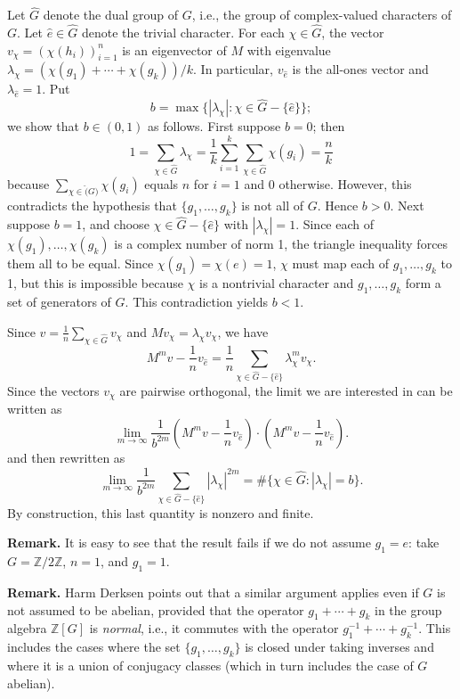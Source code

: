 \documentclass[amssymb,twocolumn,pra,10pt,aps]{revtex4-1}
\newcommand{\ZZ}{\mathbb{Z}}
\begin{document}
\begin{itemize}
Let $\hat{G}$ denote the dual group of $G$, i.e., the group of complex-valued characters of $G$.
Let $\hat{e} \in \hat{G}$ denote the trivial character.
For each $\chi \in \hat{G}$, the vector $v_\chi = (\chi(h_i))_{i=1}^n$ is an eigenvector of $M$
with eigenvalue $\lambda_\chi = (\chi(g_1) + \cdots + \chi(g_k))/k$.
In particular, $v_{\hat{e}}$ is the all-ones vector and $\lambda_{\hat{e}} = 1$.
Put
\[
b = \max\{|\lambda_\chi|: \chi \in \hat{G} - \{\hat{e}\}\};
\]
we show that $b \in (0,1)$ as follows.
First suppose $b=0$; then
\[
1 = \sum_{\chi \in \hat{G}} \lambda_\chi
= \frac{1}{k} \sum_{i=1}^k \sum_{\chi \in \hat{G}} \chi(g_i) = \frac{n}{k}
\]
because $\sum_{\chi \in \hat(G)} \chi(g_i)$ equals $n$ for $i=1$ and $0$ otherwise.
However, this contradicts the hypothesis that $\{g_1, \dots, g_k\}$ is not all of $G$.
Hence $b > 0$. Next suppose $b=1$, and choose $\chi \in \hat{G} - \{\hat{e}\}$ with $|\lambda_\chi| = 1$.
Since each of
$\chi(g_1), \dots, \chi(g_k)$ is a complex number of norm 1, the triangle inequality forces them all to be equal.
Since $\chi(g_1) = \chi(e) = 1$, $\chi$ must map each of $g_1,\dots, g_k$ to 1, but this is impossible because
$\chi$ is a nontrivial character and $g_1,\dots,g_k$ form a set of generators of $G$.
This contradiction yields $b < 1$.

Since $v = \frac{1}{n} \sum_{\chi \in \hat{G}} v_\chi$
and $M v_\chi = \lambda_\chi v_\chi$, we have
\[
M^m v - \frac{1}{n} v_{\hat{e}}
= \frac{1}{n} \sum_{\chi \in \hat{G} - \{\hat{e}\}} \lambda_\chi^m v_\chi.
\]
Since the vectors $v_\chi$ are pairwise orthogonal,
the limit we are interested in can be written as
\[
\lim_{m \to \infty} \frac{1}{b^{2m}} (M^m v - \frac{1}{n} v_{\hat{e}}) \cdot (M^m v - \frac{1}{n} v_{\hat{e}}).
\]
and then rewritten as
\[
\lim_{m \to \infty} \frac{1}{b^{2m}} \sum_{\chi \in \hat{G} - \{\hat{e}\}} |\lambda_\chi|^{2m}
= \#\{\chi \in \hat{G}: |\lambda_\chi| = b\}.
\]
By construction, this last quantity is nonzero and finite.


\textbf{Remark.}
It is easy to see that the result fails if we do not assume $g_1 = e$: take $G = \ZZ/2\ZZ$,
$n=1$, and $g_1 = 1$.

\textbf{Remark.}
Harm Derksen points out that a similar argument applies even if $G$ is not assumed to be abelian,
provided that the operator $g_1 + \cdots + g_k$ in the group algebra $\ZZ[G]$ is \emph{normal},
i.e., it commutes with the operator $g_1^{-1} + \cdots + g_k^{-1}$.
This includes the cases where the set $\{g_1,\dots,g_k\}$ is closed under taking inverses
and where it is a union of conjugacy classes (which in turn includes the case of $G$ abelian).


\end{itemize}
\end{document}
